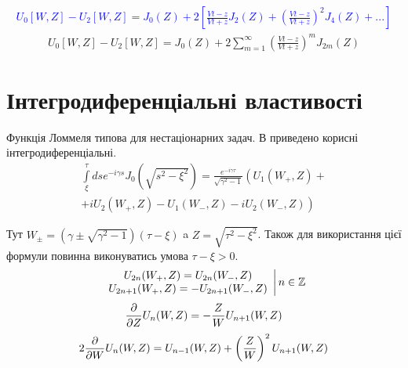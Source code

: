 %
\textcolor{blue}{ \begin{equation*} \begin{aligned}
U_0 [W, Z] - U_2 [W, Z] = J_0(Z) + 2 \left[ 
\frac{\mathit{V}t - z}{\mathit{V}t + z} J_2(Z) + \left( 
\frac{\mathit{V}t - z}{\mathit{V}t + z} \right)^2 J_4(Z) + ... \right]
\end{aligned} \end{equation*} }
%
\begin{equation} \begin{aligned}
U_0 [W, Z] - U_2 [W, Z] = J_0(Z) + 2 \sum_{m=1}^{\infty} \left( 
\frac{\mathit{V}t - z}{\mathit{V}t + z} \right)^m J_{2m} (Z)
\end{aligned} \end{equation}

\section{Інтегродиференціальні властивості}

Функція Ломмеля типова для нестаціонарних задач. В \cite[ст. 41]{imp:Borisov1991} 
приведено корисні інтегродиференціальні.
%
\begin{equation} \begin{aligned}
\int \limits_{\xi}^{\tau} ds e^{-i \gamma s} J_0(\sqrt{s^2 - \xi^2 }) = 
\frac{e^{-i \gamma \tau}}{\sqrt{\gamma^2 - 1}} \left( U_1(W_+,Z) + \right. \\ 
\left. + i U_2(W_+,Z) - U_1(W_-,Z) - i U_2(W_-,Z) \right)
\end{aligned} \end{equation}

Тут $ W_\pm = (\gamma \pm \sqrt{\gamma^2 - 1}) (\tau - \xi) $ a 
$ Z = \sqrt{\tau^2 - \xi^2} $. Також для використання цієї формули повинна
виконуватись умова $ \tau - \xi > 0 $.
%
\textcolor{red}{ \begin{equation}
\left. \begin{array}{c}
U_{2n} (W_+, Z) = U_{2n} (W_-, Z) \\
U_{2n+1} (W_+, Z) = - U_{2n+1} (W_-, Z)
\end{array} \right| n \in \mathbb{Z}
\end{equation} }
%
\begin{equation} 
\frac{\partial }{\partial Z} U_n (W,Z) = - \frac{Z}{W} U_{n+1} (W,Z)
\end{equation}
%
\begin{equation}
2 \frac{\partial }{\partial W} U_n (W,Z) = U_{n-1} (W,Z) + 
\left( \frac{Z}{W} \right)^2 U_{n+1} (W,Z)
\end{equation}

